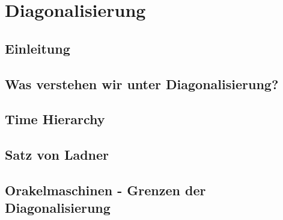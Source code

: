 \section{Diagonalisierung}
\subsection[Einleitung]{Einleitung}


\subsection[Diagonalisierung]{Was verstehen wir unter Diagonalisierung?}

\subsection[Time Hierarchy]{Time Hierarchy}

\subsection[Satz von Ladner]{Satz von Ladner}

\subsection[Orakelmaschinen]{Orakelmaschinen - Grenzen der Diagonalisierung}
